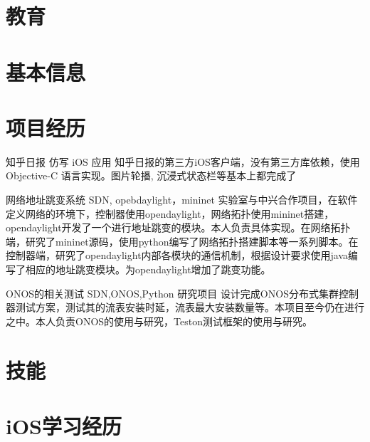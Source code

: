 \documentclass[11pt,a4paper]{moderncv}
\title{}               %
\begin{document}
\maketitle

\section{教育}

\section{基本信息}

\section{项目经历}
\renewcommand{\baselinestretch}{1.2}

\vspace*{0.2\baselineskip}
{知乎日报 仿写 iOS 应用}
{}
{}{}
{知乎日报的第三方iOS客户端，没有第三方库依赖，使用 Objective-C 语言实现。图片轮播, 沉浸式状态栏等基本上都完成了}

{网络地址跳变系统}
{SDN, opebdaylight，mininet}
{}{}
{实验室与中兴合作项目，在软件定义网络的环境下，控制器使用opendaylight，网络拓扑使用mininet搭建，opendaylight开发了一个进行地址跳变的模块。本人负责具体实现。在网络拓扑端，研究了mininet源码，使用python编写了网络拓扑搭建脚本等一系列脚本。在控制器端，研究了opendaylight内部各模块的通信机制，根据设计要求使用java编写了相应的地址跳变模块。为opendaylight增加了跳变功能。}

\vspace*{0.2\baselineskip}
{ONOS的相关测试}
{SDN,ONOS,Python}
{研究项目}{}
{设计完成ONOS分布式集群控制器测试方案，测试其的流表安装时延，流表最大安装数量等。本项目至今仍在进行之中。本人负责ONOS的使用与研究，Teston测试框架的使用与研究。}



\renewcommand{\baselinestretch}{1.0}


\section{技能}

\section{iOS学习经历}





\closesection{}                   %
\renewcommand{\listitemsymbol}{-} %
\end{document}
